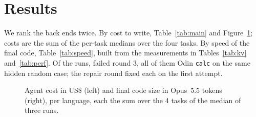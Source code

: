 \documentclass[11pt,a4paper]{article}
\begin{document}
\section{Results}

We rank the back ends twice. By cost to write, Table~\ref{tab:main} and Figure~\ref{fig:cost}; costs are
the sum of the per-task medians over the four tasks. By speed of the final code, Table~\ref{tab:speed},
built from the measurements in Tables~\ref{tab:kv} and~\ref{tab:perf}. Of the \NRuns{} runs, \NFailedRoundThree{} failed round 3, all of
them Odin \texttt{calc} on the same hidden random case; the repair round fixed each on the first attempt.

\begin{table}[h]
\centering\small
\caption{Per language, summing the medians of the 4 tasks. ``Solved'': passed the hidden suite in
round 3. ``1st try'': the first run of the examples already passed. ``Code'': Opus 5.5 tokens of the
final code. ``Stdlib'': reads of the toolchain's own sources/docs.}
\label{tab:main}
\LeaderboardTable
\end{table}

\begin{figure}[h]
\centering
\begin{minipage}{0.49\linewidth}\centering\CostPlot\end{minipage}\hfill
\begin{minipage}{0.49\linewidth}\centering\CodePlot\end{minipage}
\caption{Agent cost in US\$ (left) and final code size in Opus~5.5 tokens (right), per language, each the sum
over the 4 tasks of the median of three runs.}
\label{fig:cost}
\end{figure}

\begin{table}[h]
\centering\small
\caption{\texttt{kvhttp}: dependencies chosen by the agent, disk after a cold build (project + caches it
created), build time and throughput.}
\label{tab:kv}
\KvTable
\end{table}

\begin{table}[h]
\centering\small
\caption{Final binary performance (median of 5 runs), including process start-up (and JVM start-up for
Java, Kotlin and Clojure).}
\label{tab:perf}
\PerfTable
\end{table}

\begin{table}[h]
\centering\small
\caption{Performance ranking. Points per task: $100 \times$ the fastest time divided by the language's
(\texttt{kvhttp}: its throughput divided by the best), so 100 is the fastest. Score: geometric mean of the
four. $\times$fastest: speed index, $100 / \mathrm{score}$.}
\label{tab:speed}
\SpeedTable
\end{table}
\end{document}
